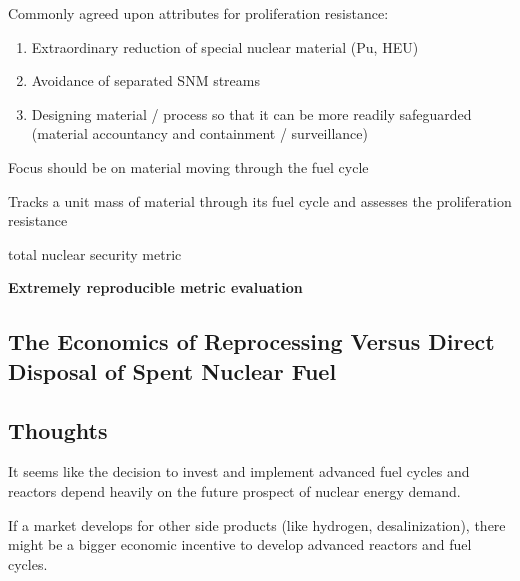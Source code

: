 Commonly agreed upon attributes for proliferation resistance:
\begin{enumerate}
    \item Extraordinary reduction of special nuclear material (Pu, HEU)
    \item Avoidance of separated SNM streams
    \item Designing material / process so that it can be more readily safeguarded (material accountancy and containment / surveillance)
\end{enumerate}

Focus should be on material moving through the fuel cycle

Tracks a unit mass of material through its fuel cycle and assesses the proliferation resistance

total nuclear security metric

\textbf{Extremely reproducible metric evaluation}


\subsection{The Economics of Reprocessing Versus Direct Disposal of Spent Nuclear Fuel}
\cite{bunn_economcis_2004}


\subsection{Thoughts}

It seems like the decision to invest and implement advanced fuel cycles and 
reactors depend heavily on the future prospect of nuclear energy demand.

If a market develops for other side products (like hydrogen, desalinization),
there might be a bigger economic incentive to develop advanced reactors and 
fuel cycles.


